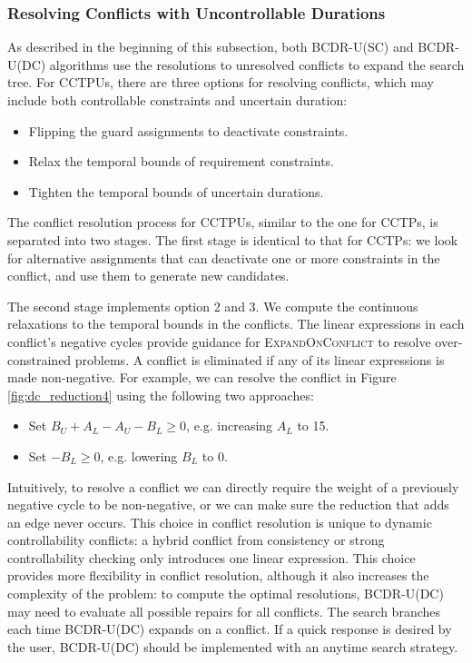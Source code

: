 \documentclass[jair,twoside,11pt,theapa]{article}
\begin{document}
\subsubsection{Resolving Conflicts with Uncontrollable Durations}

As described in the beginning of this subsection, both BCDR-U(SC) and BCDR-U(DC) algorithms use the resolutions to
unresolved conflicts to expand the search tree. For CCTPUs, there are three
options for resolving conflicts, which may include both controllable
constraints and uncertain duration:

\begin{itemize}
	\item Flipping the guard assignments to deactivate constraints.
	
	\item Relax the temporal bounds of requirement constraints.
	
	\item Tighten the temporal bounds of uncertain durations.
\end{itemize}


The conflict resolution process for CCTPUs, similar to the one for CCTPs, is 
separated into two stages. The first stage is identical to that for CCTPs: we
look for alternative assignments that can deactivate one or more constraints in
the conflict, and use them to generate new candidates.

The second stage implements option 2 and 3. We compute the continuous
relaxations to the temporal bounds in the conflicts. The linear expressions
in each conflict's negative cycles provide guidance for \textsc{ExpandOnConflict} to resolve
over-constrained problems. A conflict is eliminated if any of its linear
expressions is made non-negative. For example, we can resolve the conflict in
Figure \ref{fig:dc_reduction4} using the following two approaches:


\begin{itemize}
	\item Set $B_U+A_L-A_U-B_L \geq 0$, e.g. increasing $A_L$ to 15.
	\item Set $-B_L \geq 0$, e.g. lowering  $B_L$ to 0.
\end{itemize}


Intuitively, to resolve a conflict we can directly require the weight of a
previously negative cycle to be non-negative, or we can make sure the reduction
that adds an edge never occurs. This choice in conflict resolution is unique to
dynamic controllability conflicts: a hybrid conflict from consistency or strong
controllability checking only introduces one linear expression. This choice
provides more flexibility in conflict resolution, although it also increases the
complexity of the problem: to compute the optimal resolutions, BCDR-U(DC) may
need to evaluate all possible repairs for all conflicts. The search branches
each time BCDR-U(DC) expands on a conflict. If a quick response is desired by
the user, BCDR-U(DC) should be implemented with an anytime search strategy.
\end{document}
